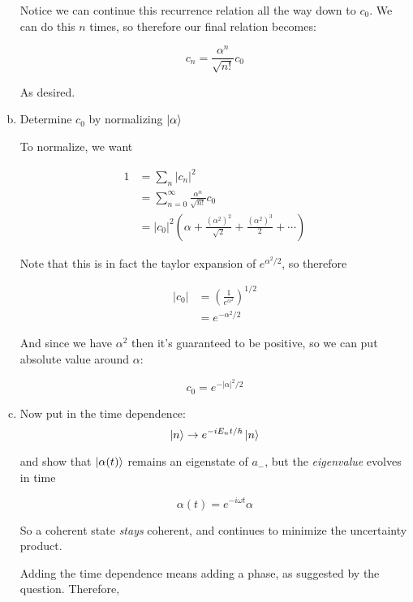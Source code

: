 \documentclass[10pt]{article}
\begin{document}
\begin{enumerate}[(a)]
\begin{solution}
            Notice we can continue this recurrence relation all the way down to $c_0$. We can do this $n$ times, so therefore our final relation becomes:

            \[ c_n = \frac{\alpha^n}{\sqrt{n!}} c_0\]

            As desired.
        \end{solution}

        \item Determine $c_0$ by normalizing $\ket \alpha$ 
        
        \begin{solution}
            To normalize, we want 

            \begin{align*}
                1 &= \sum_n |c_n|^2 \\
                &= \sum_{n = 0}^\infty \frac{\alpha^n}{\sqrt{n!}}c_0 \\
                &= |c_0|^2 \left(\alpha + \frac{(\alpha^2)^2}{\sqrt{2}} + \frac{(\alpha^2)^3}{2} + \cdots\right)
            \end{align*}

            Note that this is in fact the taylor expansion of $e^{\alpha^2/2}$, so therefore 

            \begin{align*}
                |c_0| &= \left(\frac{1}{e^{\alpha^2}}\right)^{1/2}\\
                &= e^{-\alpha^2/2}
            \end{align*}

            And since we have $\alpha^2$ then it's guaranteed to be positive, so we can put absolute value around $\alpha$:

            \[ c_0 = e^{-|\alpha|^2/2}\]
        \end{solution}
        \item Now put in the time dependence:
        \[ \ket n \to e^{-iE_nt/\hbar} \ket n\]

        and show that $\ket{\alpha(t)}$ remains an eigenstate of $a_-$, but the \textit{eigenvalue} evolves in time

        \[ \alpha(t) = e^{-i\omega t}\alpha\]

        So a coherent state \textit{stays} coherent, and continues to minimize the uncertainty product. 

        \begin{solution}
            Adding the time dependence means adding a phase, as suggested by the question. Therefore, 


\end{solution}
\end{enumerate}
\end{document}
